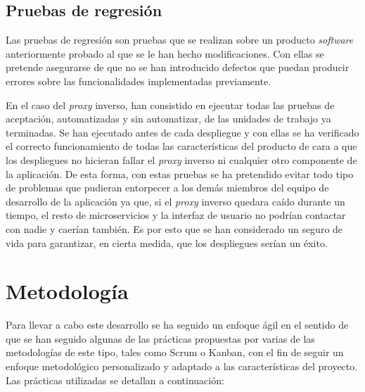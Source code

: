 \documentclass[11pt,spanish,listoffigures]{tfgetsinf}
\begin{document}

		\subsection{Pruebas de regresión} \label{pruebasDeRegresion}

Las pruebas de regresión son pruebas que se realizan sobre un producto \emph{software} anteriormente probado al que se le han hecho modificaciones. Con ellas se pretende asegurarse de que no se han introducido defectos que puedan producir errores sobre las funcionalidades implementadas previamente. 

En el caso del \emph{proxy} inverso, han consistido en ejecutar todas las pruebas de aceptación, automatizadas y sin automatizar, de las unidades de trabajo ya terminadas. Se han ejecutado antes de cada despliegue y con ellas se ha verificado el correcto funcionamiento de todas las características del producto de cara a que los despliegues no hicieran fallar el \emph{proxy} inverso ni cualquier otro componente de la aplicación. De esta forma, con estas pruebas se ha pretendido evitar todo tipo de problemas que pudieran entorpecer a los demás miembros del equipo de desarrollo de la aplicación ya que, si el \emph{proxy} inverso quedara caído durante un tiempo, el resto de microservicios y la interfaz de usuario no podrían contactar con nadie y caerían también. Es por esto que se han considerado un seguro de vida para garantizar, en cierta medida, que los despliegues serían un éxito.


	\section{Metodología} \label{metodologia}

Para llevar a cabo este desarrollo se ha seguido un enfoque ágil en el sentido de que se han seguido algunas de las prácticas propuestas por varias de las metodologías de este tipo, tales como Scrum o Kanban, con el fin de seguir un enfoque metodológico personalizado y adaptado a las características del proyecto. Las prácticas utilizadas se detallan a continuación:
\end{document}
